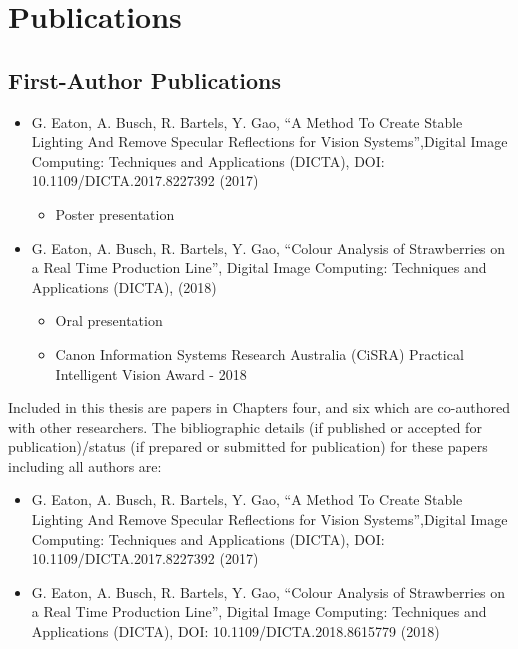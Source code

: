 \documentclass[fleqn,twoside,12pt]{report}
\begin{document}
\chapter*{Publications}


\section{First-Author Publications}

\begin{itemize}
	\item{G. Eaton, A. Busch, R. Bartels, Y. Gao, “A Method To Create Stable Lighting And Remove Specular Reflections for Vision Systems”,Digital Image Computing: Techniques and Applications (DICTA), DOI: 10.1109/DICTA.2017.8227392 (2017)}
	\begin{itemize}
		\item Poster presentation 
	\end{itemize}
	\quad
	\item{G. Eaton, A. Busch, R. Bartels, Y. Gao, “Colour Analysis of Strawberries on a Real Time Production Line”, Digital Image Computing: Techniques and Applications (DICTA), (2018)}
	\begin{itemize}
		\item Oral presentation 
		\item Canon Information Systems Research Australia (CiSRA) Practical Intelligent Vision Award - 2018
	\end{itemize}
\end{itemize}  

Included in this thesis are papers in Chapters four, and six which are co-authored
with other researchers. The bibliographic details (if published or accepted for publication)/status (if prepared or submitted for publication) for these papers including all authors are:

\begin{itemize}
	\item{G. Eaton, A. Busch, R. Bartels, Y. Gao, “A Method To Create Stable Lighting And Remove Specular Reflections for Vision Systems”,Digital Image Computing: Techniques and Applications (DICTA), DOI: 10.1109/DICTA.2017.8227392 (2017)}
	\quad
	\item{G. Eaton, A. Busch, R. Bartels, Y. Gao, “Colour Analysis of Strawberries on a Real Time Production Line”, Digital Image Computing: Techniques and Applications (DICTA), DOI: 10.1109/DICTA.2018.8615779 (2018)}
\end{itemize}  
\end{document}
